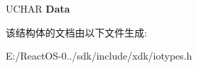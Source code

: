 \begin{DoxyCompactItemize}
\begin{tabbing}
\end{tabbing}\item 
\mbox{\label{struct___p_c_i___p_m___c_a_p_a_b_i_l_i_t_y_af804dcc77b39b5919cdb3d3057efca96}} 
U\+C\+H\+AR {\bfseries Data}
\end{DoxyCompactItemize}


该结构体的文档由以下文件生成\+:\begin{DoxyCompactItemize}
\item 
E\+:/\+React\+O\+S-\/0../sdk/include/xdk/iotypes.\+h\end{DoxyCompactItemize}
